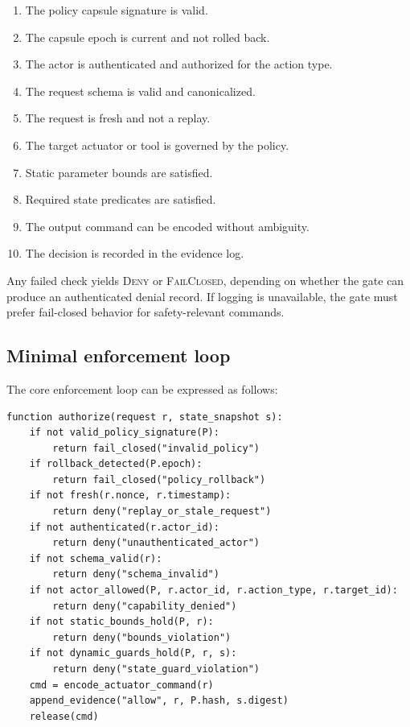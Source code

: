 \documentclass[10pt]{article}
\begin{document}
\begin{enumerate}[leftmargin=*]
  \item The policy capsule signature is valid.
  \item The capsule epoch is current and not rolled back.
  \item The actor is authenticated and authorized for the action type.
  \item The request schema is valid and canonicalized.
  \item The request is fresh and not a replay.
  \item The target actuator or tool is governed by the policy.
  \item Static parameter bounds are satisfied.
  \item Required state predicates are satisfied.
  \item The output command can be encoded without ambiguity.
  \item The decision is recorded in the evidence log.
\end{enumerate}

Any failed check yields \textsc{Deny} or \textsc{FailClosed}, depending on whether the gate can produce an authenticated denial record. If logging is unavailable, the gate must prefer fail-closed behavior for safety-relevant commands.

\subsection{Minimal enforcement loop}

The core enforcement loop can be expressed as follows:

\begin{lstlisting}[caption={Minimal deterministic enforcement loop.}]
function authorize(request r, state_snapshot s):
    if not valid_policy_signature(P):
        return fail_closed("invalid_policy")
    if rollback_detected(P.epoch):
        return fail_closed("policy_rollback")
    if not fresh(r.nonce, r.timestamp):
        return deny("replay_or_stale_request")
    if not authenticated(r.actor_id):
        return deny("unauthenticated_actor")
    if not schema_valid(r):
        return deny("schema_invalid")
    if not actor_allowed(P, r.actor_id, r.action_type, r.target_id):
        return deny("capability_denied")
    if not static_bounds_hold(P, r):
        return deny("bounds_violation")
    if not dynamic_guards_hold(P, r, s):
        return deny("state_guard_violation")
    cmd = encode_actuator_command(r)
    append_evidence("allow", r, P.hash, s.digest)
    release(cmd)
\end{lstlisting}
\end{document}
